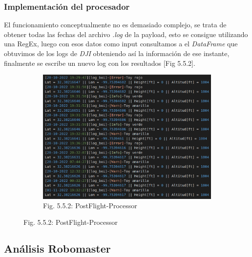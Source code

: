 \documentclass[12pt]{article}
\begin{document}
\subsubsection{Implementación del procesador}
El funcionamiento conceptualmente no es demasiado complejo, se trata de obtener todas las fechas del archivo \textit{.log} de la payload, esto se consigue utilizando una RegEx, luego con esos datos como input consultamos a el \textit{DataFrame} que obtuvimos de los logs de \textit{DJI} obteniendo así la información de ese instante, finalmente se escribe un nuevo log con los resultados [Fig 5.5.2].

\begin{figure}[ht]
  \centering
  \begin{subfigure}[a]{1\linewidth}
    \includegraphics[width=\linewidth]{images/post-flight-processor.png}
    \caption{Fig. 5.5.2: PostFlight-Processor}
  \end{subfigure}
\end{figure}

\subsection{Análisis Robomaster}
\end{document}
